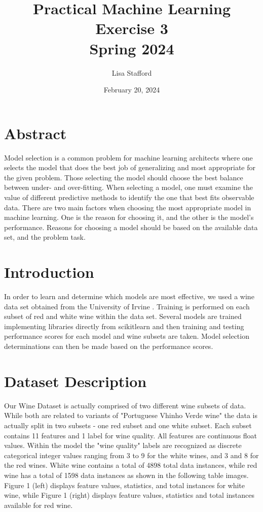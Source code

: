 \documentclass[titlepage]{article}
\title{%
	Practical Machine Learning\\
	
	\vspace*{2em}
	\LARGE Exercise 3 \\
	Spring 2024}
\author{Lisa Stafford}
\date{February 20, 2024}
\begin{document}
	\setlength\parindent{0pt}
	
	\maketitle
	
	\section*{Abstract}
	Model selection is a common problem for machine learning architects where one selects the model that does the best job of generalizing and most appropriate for the given problem.  Those selecting the model should choose the best balance between under- and over-fitting.  When selecting a model, one must examine the value of different predictive methods to identify the one that best fits observable data.  There are two main factors when choosing the most appropriate model in machine learning.  One is the reason for choosing it, and the other is the model's performance.  Reasons for choosing a model should be based on the available data set, and the problem task.
	
	\section*{Introduction}
	In order to learn and determine which models are most effective, we used a wine data set obtained from the University of Irvine \cite{dataset}. Training is performed on each subset of red and white wine within the data set.  Several models are trained implementing libraries directly from scikitlearn \cite{scikitlearn} and then training and testing performance scores for each model and wine subsets are taken.  Model selection determinations can then be made based on the performance scores.  

	
	\section*{Dataset Description}
	Our Wine Dataset is actually comprised of two different wine subsets of data.  While both are related to variants of \cite{dataset} "Portuguese Vhinho Verde wine" the data is actually split in two subsets - one red subset and one white subset.  Each subset contains 11 features and 1 label for wine quality.   All features are continuous float values.  Within the model the "wine quality" labels are recognized as discrete categorical integer values ranging from 3 to 9 for the white wines, and 3 and 8 for the red wines.  White wine contains a total of 4898 total data instances, while red wine has a total of 1598 data instances as shown in the following table images. Figure 1 (left) displays feature values, statistics, and total instances for white wine, while Figure 1 (right) displays feature values, statistics and total instances available for red wine.
	
\end{document}
